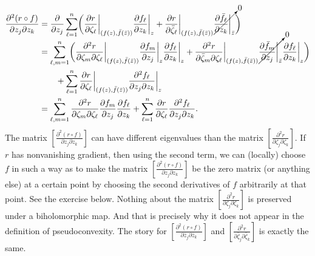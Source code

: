 \documentclass[12pt,openany]{book}
\theoremstyle{plain}
\theoremstyle{remark}
\theoremstyle{definition}
\theoremstyle{exercise}
\theoremstyle{example}
\begin{document}
\begin{equation*} %
\begin{split}
\frac{\partial^2 (r \circ f)}{\partial z_j \partial z_k}
& =
\frac{\partial}{\partial z_j }
\sum_{\ell=1}^n 
\biggl(
\frac{\partial r}{\partial \zeta_\ell}
\bigg|_{(f(z),\bar{f}(\bar{z}))}
\frac{\partial f_\ell}{\partial z_k} \bigg|_{z}
+
\frac{\partial r}{\partial \bar{\zeta}_\ell}
\bigg|_{(f(z),\bar{f}(\bar{z}))}
\cancelto{0}{\frac{\partial \bar{f}_\ell}{\partial z_k} \bigg|_{\bar{z}}}
\biggr)
\\
& =
\sum_{\ell,m=1}^n
\biggl(
\frac{\partial^2 r}{\partial \zeta_m \partial \zeta_\ell}
\bigg|_{(f(z),\bar{f}(\bar{z}))}
\frac{\partial f_m}{\partial z_j} \bigg|_z 
\frac{\partial f_\ell}{\partial z_k} \bigg|_z 
+
\frac{\partial^2 r}{\partial \bar{\zeta}_m \partial \zeta_\ell}
\bigg|_{(f(z),\bar{f}(\bar{z}))}
\smash{\cancelto{0}{\frac{\partial \bar{f}_m}{\partial z_j} \bigg|_{\bar{z}} }}
\frac{\partial f_\ell}{\partial z_k} \bigg|_z 
\biggr)
\\
& \qquad +
\sum_{\ell=1}^n 
\frac{\partial r}{\partial \zeta_\ell} \bigg|_{(f(z),\bar{f}(\bar{z}))}
\frac{\partial^2 f_\ell}{\partial z_j \partial z_k} \bigg|_z
\\
&=
\sum_{\ell,m=1}^n
\frac{\partial^2 r}{\partial \zeta_m \partial \zeta_\ell}
\frac{\partial f_m}{\partial z_j}
\frac{\partial f_\ell}{\partial z_k}
+
\sum_{\ell=1}^n 
\frac{\partial r}{\partial \zeta_\ell}
\frac{\partial^2 f_\ell}{\partial z_j \partial z_k} .
\end{split}
\end{equation*}
The matrix 
$\left[ \frac{\partial^2 (r \circ f)}{\partial z_j \partial z_k} \right]$
can have different eigenvalues than the matrix
$\left[ \frac{\partial^2 r}{\partial \zeta_j \partial \zeta_k} \right]$.
If $r$ has nonvanishing gradient, then
using the second term, we can (locally) choose $f$ in such a way as to make
the matrix
$\left[ \frac{\partial^2 (r \circ f)}{\partial z_j \partial z_k} \right]$
be the zero matrix (or anything else) at a certain point by choosing the second
derivatives of $f$ arbitrarily at that point.  See the exercise below.  Nothing about the matrix
$\left[ \frac{\partial^2 r}{\partial \zeta_j \partial \zeta_k} \right]$ is
preserved under a biholomorphic map.  And that is precisely why it does not
appear in the definition of pseudoconvexity.
The story for
$\left[ \frac{\partial^2 (r \circ f)}{\partial \bar{z}_j \partial \bar{z}_k} \right]$
and
$\left[ \frac{\partial^2 r}{\partial \bar{\zeta}_j \partial \bar{\zeta}_k} \right]$ is
exactly the same.
\end{document}
